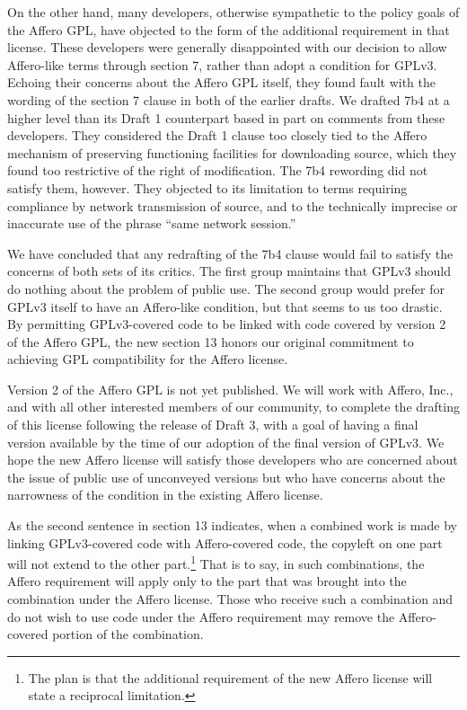 On the other hand, many developers, otherwise sympathetic to the policy
goals of the Affero GPL, have objected to the form of the additional
requirement in that license.  These developers were generally
disappointed with our decision to allow Affero-like terms through
section 7, rather than adopt a condition for GPLv3.  Echoing their
concerns about the Affero GPL itself, they found fault with the wording
of the section 7 clause in both of the earlier drafts.  We drafted 7b4
at a higher level than its Draft 1 counterpart based in part on comments
from these developers. They considered the Draft 1 clause too closely
tied to the Affero mechanism of preserving functioning facilities for
downloading source, which they found too restrictive of the right of
modification.  The 7b4 rewording did not satisfy them, however. They
objected to its limitation to terms requiring compliance by network
transmission of source, and to the technically imprecise or inaccurate
use of the phrase ``same network session.''

We have concluded that any redrafting of the 7b4 clause would fail to
satisfy the concerns of both sets of its critics.  The first group
maintains that GPLv3 should do nothing about the problem of public
use. The second group would prefer for GPLv3 itself to have an
Affero-like condition, but that seems to us too drastic. By permitting
GPLv3-covered code to be linked with code covered by version 2 of the
Affero GPL, the new section 13 honors our original commitment to
achieving GPL compatibility for the Affero license.

Version 2 of the Affero GPL is not yet published.  We will work with
Affero, Inc., and with all other interested members of our community, to
complete the drafting of this license following the release of Draft 3,
with a goal of having a final version available by the time of our
adoption of the final version of GPLv3.  We hope the new Affero license
will satisfy those developers who are concerned about the issue of
public use of unconveyed versions but who have concerns about the
narrowness of the condition in the existing Affero license.

As the second sentence in section 13 indicates, when a combined work is
made by linking GPLv3-covered code with Affero-covered code, the
copyleft on one part will not extend to the other part.\footnote{The
plan is that the additional requirement of the new Affero license will
state a reciprocal limitation.} That is to say, in such combinations,
the Affero requirement will apply only to the part that was brought into
the combination under the Affero license.  Those who receive such a
combination and do not wish to use code under the Affero requirement may
remove the Affero-covered portion of the combination.

